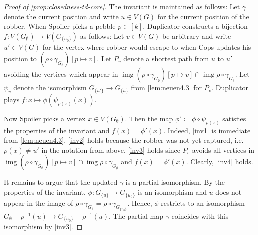 \documentclass[10pt,a4paper]{article}
\DeclareMathOperator{\img}{img}
\begin{document}
\begin{proof}[Proof of \cref{prop:closedness-td-core}]
	The invariant is maintained as follows: Let $\gamma$ denote the current position and write $u \in V(G)$ for the current position of the robber. When Spoiler picks a pebble $p \in [k]$, Duplicator constructs a bijection $f \colon V(G_\emptyset) \to V(G_{\{u_0\}})$ as follows:
	Let $v \in V(G)$ be arbitrary and write $u' \in V(G)$ for the vertex where robber would escape to when Cops updates his position to $(\rho \circ \gamma_{G_\emptyset})[p \mapsto v]$. Let $P_v$ denote a shortest path from $u$ to $u'$ avoiding the vertices which appear in $\img (\rho \circ \gamma_{G_\emptyset})[p \mapsto v] \cap \img \rho \circ \gamma_{G_\emptyset}$.
	Let $\psi_v$ denote the isomorphism $G_{\{u'\}} \to G_{\{u\}}$ from \cref{lem:neuen4.3} for $P_v$.
	Duplicator plays $f \colon x \mapsto \phi(\psi_{\rho(x)}(x))$.
	
	Now Spoiler picks a vertex $x \in V(G_\emptyset)$. Then the map $\phi' \coloneqq \phi \circ \psi_{\rho(x)}$ satisfies the properties of the invariant and $f(x) = \phi'(x)$. Indeed, \cref{inv1} is immediate from \cref{lem:neuen4.3}. \cref{inv2} holds because the robber was not yet captured, i.e.\@ $\rho(x) \neq u'$ in the notation from above. \cref{inv3} holds since $P_v$ avoids all vertices in $\img (\rho \circ \gamma_{G_\emptyset})[p \mapsto v] \cap \img \rho \circ \gamma_{G_\emptyset}$ and $f(x) = \phi'(x)$. Clearly, \cref{inv4} holds.
	
	It remains to argue that the updated $\gamma$ is a partial isomorphism. By the properties of the invariant, $\phi \colon G_{\{u\}} \to G_{\{u_0\}}$ is an isomorphism and $u$ does not appear in the image of $\rho \circ \gamma_{G_\emptyset} = \rho \circ \gamma_{G_{\{u_0\}}}$. Hence, $\phi$ restricts to an isomorphism $G_\emptyset - \rho^{-1}(u) \to G_{\{u_0\}} - \rho^{-1}(u)$. The partial map $\gamma$ coincides with this isomorphism by \cref{inv3}.
\end{proof}
 
\end{document}
